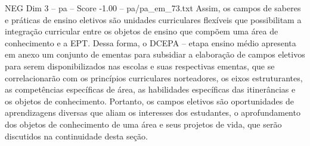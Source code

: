 \begin{textsample}{NEG Dim 3 – pa – Score -1.00 – pa/pa\_em\_73.txt}
Assim, os campos de saberes e práticas de ensino eletivos são unidades curriculares flexíveis que possibilitam a integração curricular entre os objetos de ensino que compõem uma área de conhecimento e a EPT.
Dessa forma, o DCEPA – etapa ensino médio apresenta em anexo um conjunto de ementas para subsidiar a elaboração de campos eletivos para serem disponibilizados nas escolas e suas respectivas ementas, que se correlacionarão com os princípios curriculares norteadores, os eixos estruturantes, as competências específicas de área, as habilidades específicas das itinerâncias e os objetos de conhecimento.
Portanto, os campos eletivos são oportunidades de aprendizagens diversas que aliam os interesses dos estudantes, o aprofundamento dos objetos de conhecimento de uma área e seus projetos de vida, que serão discutidos na continuidade desta seção.

\end{textsample}
